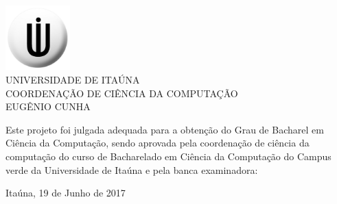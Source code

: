 \begin{folhadeaprovacao}
\setlength{\ABNTsignthickness}{0.2pt}
\setlength{\ABNTsignskip}{1.7cm}

\begin{center}
\includegraphics[width=2.5cm]{figuras/brasao_uit.pdf}\\
            {UNIVERSIDADE DE ITAÚNA} \\
            {COORDENAÇÃO DE CIÊNCIA DA COMPUTAÇÃO}  \\

    \vspace{1.5cm}
                                    {EUGÊNIO CUNHA}\\
    \bfseries{}
\end{center}

Este projeto foi julgada adequada para a obten\c{c}\~{a}o do Grau de Bacharel em Ciência da Computação, sendo aprovada pela coordenação de ciência da computação do curso de Bacharelado em Ciência da Computação
do Campus verde da Universidade de Itaúna e pela banca examinadora:

    \vspace{0.15cm}
    \vspace{0.15cm}%

    \begin{center}
        Itaúna, 19 de Junho de 2017
    \end{center}
\end{folhadeaprovacao}